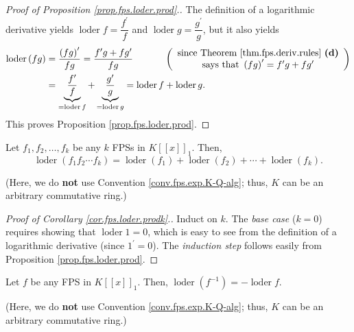 \begin{proof}
[Proof of Proposition \ref{prop.fps.loder.prod}.]The definition of a
logarithmic derivative yields $\operatorname*{loder}f=\dfrac{f^{\prime}}{f}$
and $\operatorname*{loder}g=\dfrac{g^{\prime}}{g}$, but it also yields%
\begin{align*}
\operatorname*{loder}\left(  fg\right)   &  =\dfrac{\left(  fg\right)
^{\prime}}{fg}=\dfrac{f^{\prime}g+fg^{\prime}}{fg}\ \ \ \ \ \ \ \ \ \ \left(
\begin{array}
[c]{c}%
\text{since Theorem \ref{thm.fps.deriv.rules} \textbf{(d)}}\\
\text{says that }\left(  fg\right)  ^{\prime}=f^{\prime}g+fg^{\prime}%
\end{array}
\right) \\
&  =\underbrace{\dfrac{f^{\prime}}{f}}_{=\operatorname*{loder}f}%
+\underbrace{\dfrac{g^{\prime}}{g}}_{=\operatorname*{loder}g}%
=\operatorname*{loder}f+\operatorname*{loder}g.
\end{align*}
This proves Proposition \ref{prop.fps.loder.prod}.
\end{proof}

\begin{corollary}
\label{cor.fps.loder.prodk}Let $f_{1},f_{2},\ldots,f_{k}$ be any $k$ FPSs in
$K\left[  \left[  x\right]  \right]  _{1}$. Then,
\[
\operatorname*{loder}\left(  f_{1}f_{2}\cdots f_{k}\right)
=\operatorname*{loder}\left(  f_{1}\right)  +\operatorname*{loder}\left(
f_{2}\right)  +\cdots+\operatorname*{loder}\left(  f_{k}\right)  .
\]


(Here, we do \textbf{not} use Convention \ref{conv.fps.exp.K-Q-alg}; thus, $K$
can be an arbitrary commutative ring.)
\end{corollary}

\begin{proof}
[Proof of Corollary \ref{cor.fps.loder.prodk}.]Induct on $k$. The \textit{base
case} ($k=0$) requires showing that $\operatorname*{loder}1=0$, which is easy
to see from the definition of a logarithmic derivative (since $1^{\prime}=0$).
The \textit{induction step} follows easily from Proposition
\ref{prop.fps.loder.prod}.
\end{proof}

\begin{corollary}
\label{cor.fps.loder.inv}Let $f$ be any FPS in $K\left[  \left[  x\right]
\right]  _{1}$. Then, $\operatorname*{loder}\left(  f^{-1}\right)
=-\operatorname*{loder}f$.

(Here, we do \textbf{not} use Convention \ref{conv.fps.exp.K-Q-alg}; thus, $K$
can be an arbitrary commutative ring.)
\end{corollary}

